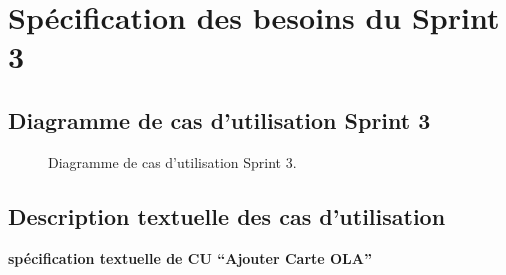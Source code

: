\documentclass[a4paper,11pt]{report}
\begin{document}
\section{Spécification des besoins du Sprint 3}
\subsection{Diagramme de cas d’utilisation Sprint 3}
\begin{figure}[H]
  \centering
  \setlength{\fboxrule}{1pt}
  \setlength{\fboxsep}{3pt}
  \caption{Diagramme de cas d’utilisation Sprint 3.}
  \label{fig:clone-result}
\end{figure}
\subsection{Description textuelle des cas d'utilisation}

\textbf{spécification textuelle de CU “Ajouter Carte OLA”}
\end{document}
